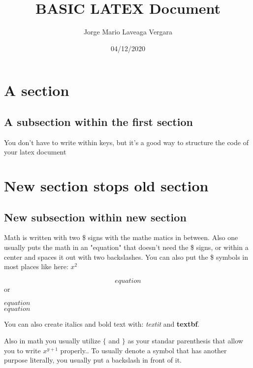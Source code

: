 \documentclass[10pt]{article}%
\title{BASIC LATEX Document}
\author{Jorge Mario Laveaga Vergara}
\date{04/12/2020}
\begin{document}
	\maketitle %
	\section{A section}
		\subsection{A subsection within the first section}
		{You don't have to write within keys, but it's a good way to structure the code of your latex document}\par %
	\section{New section stops old section}
		\subsection{New subsection within new section}
		{Math is written with two \$ signs with the mathe matics in between. Also one usually puts the math in an "equation" that doesn't need the \$ signs, or within a center and spaces it out with two backslashes. You can also put the \$ symbols in most places like here: $x^2$}\par
		\begin{equation}
			equation
		\end{equation}
		{or}\par
		\begin{center}
			$equation$
			\\
			$equation$
		\end{center}
		{You can also create italics and bold text with: \textit{textit} and \textbf{textbf}.}\par 
		{Also in math you usually utilize $\{$ and $\}$ as your standar parenthesis that allow you to write $x^{y+1}$ properly.. To usually denote a symbol that has another purpose literally, you usually put a backslash in front of it.}\par 
	
\end{document}
